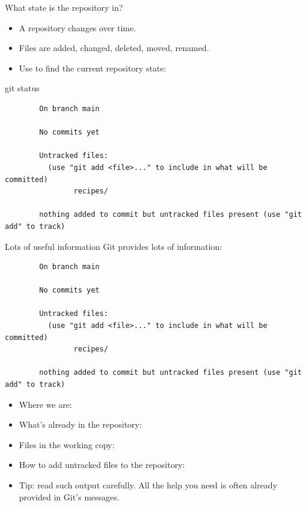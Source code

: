 \documentclass{git_course}
\begin{document}
\begin{frame}[fragile]{What state is the repository in?}
    \begin{itemize}
        \item A repository changes over time.
        \item Files are added, changed, deleted, moved, renamed.
        \item Use  to find the current repository state:
    \end{itemize}
    \begin{shellcode}
        git status
    \end{shellcode}
    \begin{verbatim}
        On branch main

        No commits yet

        Untracked files:
          (use "git add <file>..." to include in what will be committed)
                recipes/

        nothing added to commit but untracked files present (use "git add" to track)
    \end{verbatim}
\end{frame}

\begin{frame}[fragile]{Lots of useful information}
    Git provides lots of information:
    \begin{verbatim}
        On branch main

        No commits yet

        Untracked files:
          (use "git add <file>..." to include in what will be committed)
                recipes/

        nothing added to commit but untracked files present (use "git add" to track)
    \end{verbatim}

    \begin{itemize}
        \item Where we are: 
        \item What's already in the repository: 
        \item Files in the working copy: 
        \item How to add untracked files to the repository: 
        \item {} Tip: read such output carefully.  All the help
            you need is often already provided in Git's messages.
    \end{itemize}
\end{frame}
\end{document}
